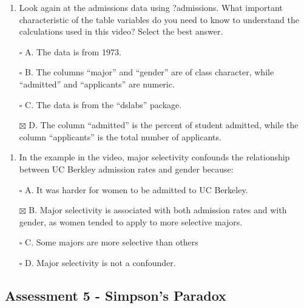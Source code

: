 \documentclass[
]{article}
\providecommand{\tightlist}{%
  \setlength{\itemsep}{0pt}\setlength{\parskip}{0pt}}
\begin{document}
\begin{enumerate}
\def\labelenumi{\arabic{enumi}.}
\setcounter{enumi}{1}
\tightlist
\item
  Look again at the admissions data using ?admissions. What important
  characteristic of the table variables do you need to know to
  understand the calculations used in this video? Select the best
  answer.
\end{enumerate}

\begin{itemize}
\tightlist
\item[$\square$]
  A. The data is from 1973.
\item[$\square$]
  B. The columns ``major'' and ``gender'' are of class character, while
  ``admitted'' and ``applicants'' are numeric.
\item[$\square$]
  C. The data is from the ``dslabs'' package.
\item[$\boxtimes$]
  D. The column ``admitted'' is the percent of student admitted, while
  the column ``applicants'' is the total number of applicants.
\end{itemize}

\begin{enumerate}
\def\labelenumi{\arabic{enumi}.}
\setcounter{enumi}{2}
\tightlist
\item
  In the example in the video, major selectivity confounds the
  relationship between UC Berkley admission rates and gender because:
\end{enumerate}

\begin{itemize}
\tightlist
\item[$\square$]
  A. It was harder for women to be admitted to UC Berkeley.
\item[$\boxtimes$]
  B. Major selectivity is associated with both admission rates and with
  gender, as women tended to apply to more selective majors.
\item[$\square$]
  C. Some majors are more selective than others
\item[$\square$]
  D. Major selectivity is not a confounder.
\end{itemize}

\hypertarget{assessment-5---simpsons-paradox}{%
\subsection{Assessment 5 - Simpson's
Paradox}\label{assessment-5---simpsons-paradox}}
\end{document}
